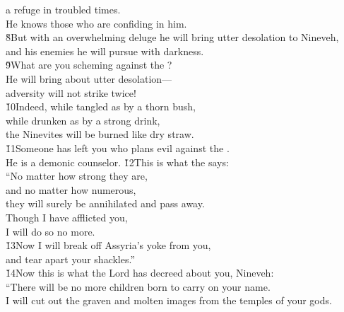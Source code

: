 \begin{poetry}
\poemll    a refuge in troubled times. \\
\poeml He knows those who are confiding in him. \\
\poeml \v{8}But with an overwhelming deluge he will bring utter desolation to Nineveh, \\
\poemll    and his enemies he will pursue with darkness. \\
\poeml \v{9}What are you scheming against the ? \\
\poemll    He will bring about utter desolation--- \\
\poemlll       adversity will not strike twice! \\
\poeml \v{10}Indeed, while tangled as by a thorn bush, \\
\poemll    while drunken as by a strong drink, \\
\poemlll       the Ninevites will be burned like dry straw. \\
\poeml \v{11}Someone has left you who plans evil against the . \\
\poemll    He is a demonic counselor.
\poeml \v{12}This is what the  says: \\
\poeml ``No matter how strong they are, \\
\poemll    and no matter how numerous, \\
\poemlll       they will surely be annihilated and pass away. \\
\poeml Though I have afflicted you, \\
\poemll    I will do so no more. \\
\poeml \v{13}Now I will break off Assyria's yoke from you, \\
\poemll    and tear apart your shackles.'' \\
\poeml \v{14}Now this is what the Lord has decreed about you, Nineveh: \\
\poemll    ``There will be no more children born to carry on your name. \\
\poeml I will cut out the graven and molten images from the temples of your gods. \\

\end{poetry}
